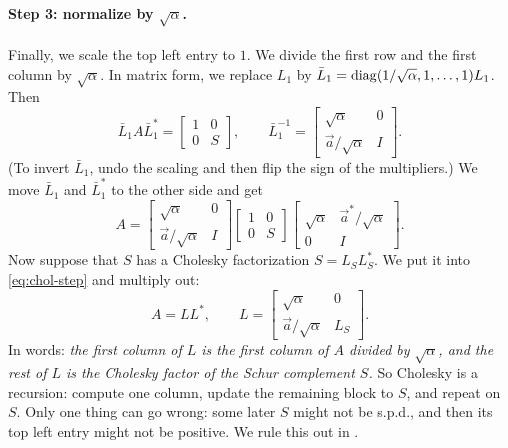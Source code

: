 \paragraph{Step 3: normalize by \texorpdfstring{$\sqrt{\alpha}$}{the Square Root of the Pivot}.} Finally, we scale the top left entry to $1$. We divide the first row and the first column by $\sqrt{\alpha}$. In matrix form, we replace $L_1$ by $\bar{L}_1 = \operatorname{diag}(1/\sqrt{\alpha}, 1, \dots, 1)L_1$. Then
\begin{equation}
  \bar{L}_1A\bar{L}_1^\ast = \begin{bmatrix} 1 & 0 \\ 0 & S \end{bmatrix}, \qquad
  \bar{L}_1^{-1} = \begin{bmatrix} \sqrt{\alpha} & 0 \\ \vec{a}/\sqrt{\alpha} & I \end{bmatrix}.
\end{equation}
(To invert $\bar{L}_1$, undo the scaling and then flip the sign of the multipliers.) We move $\bar{L}_1$ and $\bar{L}_1^\ast$ to the other side and get
\begin{equation}
  \label{eq:chol-step}
  A = \begin{bmatrix} \sqrt{\alpha} & 0 \\ \vec{a}/\sqrt{\alpha} & I \end{bmatrix}\begin{bmatrix} 1 & 0 \\ 0 & S \end{bmatrix}\begin{bmatrix} \sqrt{\alpha} & \vec{a}^\ast/\sqrt{\alpha} \\ 0 & I \end{bmatrix}.
\end{equation}
Now suppose that $S$ has a Cholesky factorization $S = L_SL_S^\ast$. We put it into \eqref{eq:chol-step} and multiply out:
\begin{equation}
  A = LL^\ast, \qquad L = \begin{bmatrix} \sqrt{\alpha} & 0 \\ \vec{a}/\sqrt{\alpha} & L_S \end{bmatrix}.
\end{equation}
In words: \emph{the first column of $L$ is the first column of $A$ divided by $\sqrt{\alpha}$, and the rest of $L$ is the Cholesky factor of the Schur complement $S$.} So Cholesky is a recursion: compute one column, update the remaining block to $S$, and repeat on $S$. Only one thing can go wrong: some later $S$ might not be s.p.d., and then its top left entry might not be positive. We rule this out in .


